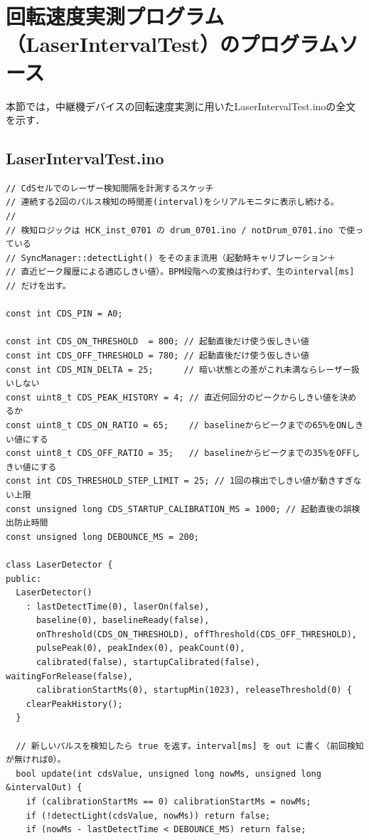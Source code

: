 \section{回転速度実測プログラム（LaserIntervalTest）のプログラムソース}
本節では，中継機デバイスの回転速度実測に用いたLaserIntervalTest.inoの全文を示す．

\subsection{LaserIntervalTest.ino}
\begin{lstlisting}[caption={LaserIntervalTest.ino}, label={lst:laser_full}]
// CdSセルでのレーザー検知間隔を計測するスケッチ
// 連続する2回のパルス検知の時間差(interval)をシリアルモニタに表示し続ける。
//
// 検知ロジックは HCK_inst_0701 の drum_0701.ino / notDrum_0701.ino で使っている
// SyncManager::detectLight() をそのまま流用（起動時キャリブレーション＋
// 直近ピーク履歴による適応しきい値）。BPM段階への変換は行わず、生のinterval[ms]
// だけを出す。

const int CDS_PIN = A0;

const int CDS_ON_THRESHOLD  = 800; // 起動直後だけ使う仮しきい値
const int CDS_OFF_THRESHOLD = 780; // 起動直後だけ使う仮しきい値
const int CDS_MIN_DELTA = 25;      // 暗い状態との差がこれ未満ならレーザー扱いしない
const uint8_t CDS_PEAK_HISTORY = 4; // 直近何回分のピークからしきい値を決めるか
const uint8_t CDS_ON_RATIO = 65;    // baselineからピークまでの65%をONしきい値にする
const uint8_t CDS_OFF_RATIO = 35;   // baselineからピークまでの35%をOFFしきい値にする
const int CDS_THRESHOLD_STEP_LIMIT = 25; // 1回の検出でしきい値が動きすぎない上限
const unsigned long CDS_STARTUP_CALIBRATION_MS = 1000; // 起動直後の誤検出防止時間
const unsigned long DEBOUNCE_MS = 200;

class LaserDetector {
public:
  LaserDetector()
    : lastDetectTime(0), laserOn(false),
      baseline(0), baselineReady(false),
      onThreshold(CDS_ON_THRESHOLD), offThreshold(CDS_OFF_THRESHOLD),
      pulsePeak(0), peakIndex(0), peakCount(0),
      calibrated(false), startupCalibrated(false), waitingForRelease(false),
      calibrationStartMs(0), startupMin(1023), releaseThreshold(0) {
    clearPeakHistory();
  }

  // 新しいパルスを検知したら true を返す。interval[ms] を out に書く（前回検知が無ければ0）。
  bool update(int cdsValue, unsigned long nowMs, unsigned long &intervalOut) {
    if (calibrationStartMs == 0) calibrationStartMs = nowMs;
    if (!detectLight(cdsValue, nowMs)) return false;
    if (nowMs - lastDetectTime < DEBOUNCE_MS) return false;


\end{lstlisting}
